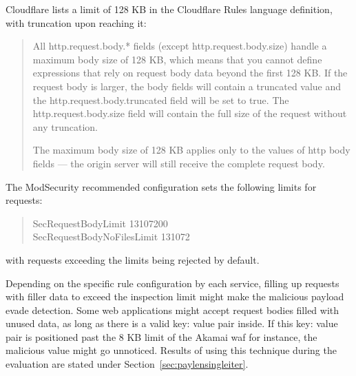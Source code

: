 Cloudflare lists a limit of 128 KB in the Cloudflare Rules language definition, with truncation upon reaching it:
\begin{quote}
	All http.request.body.* fields (except http.request.body.size) handle a maximum body size of 128 KB, which means that you cannot define expressions that rely on request body data beyond the first 128 KB. If the request body is larger, the body fields will contain a truncated value and the http.request.body.truncated field will be set to true. The http.request.body.size field will contain the full size of the request without any truncation.

	The maximum body size of 128 KB applies only to the values of \acrshort{http} body fields — the origin server will still receive the complete request body. \cite{cloudflare/limits}
\end{quote}

The ModSecurity recommended configuration sets the following limits for requests:
\begin{quote}
	SecRequestBodyLimit 13107200 \\
	SecRequestBodyNoFilesLimit 131072
\end{quote}
with requests exceeding the limits being rejected by default. \cite{modsec/recconf}

Depending on the specific rule configuration by each service, filling up requests with filler data to exceed the inspection limit might make the malicious payload evade detection. Some web applications might accept request bodies filled with unused data, as long as there is a valid key: value pair inside. If this key: value pair is positioned past the 8 KB limit of the Akamai \acrshort{waf} for instance, the malicious value might go unnoticed. Results of using this technique during the evaluation are stated under Section~\ref{sec:paylensingleiter}.


